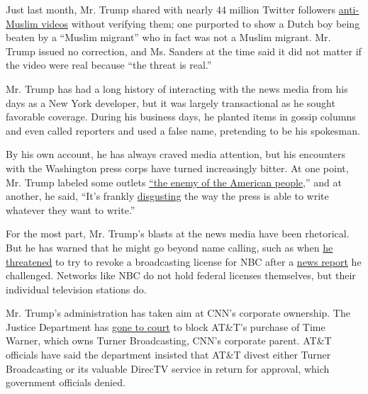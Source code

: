 Just last month, Mr. Trump shared with nearly 44 million Twitter
followers
\href{https://www.nytimes3xbfgragh.onion/2017/11/29/us/politics/trump-anti-muslim-videos-jayda-fransen.html}{anti-Muslim
videos} without verifying them; one purported to show a Dutch boy being
beaten by a ``Muslim migrant'' who in fact was not a Muslim migrant. Mr.
Trump issued no correction, and Ms. Sanders at the time said it did not
matter if the video were real because ``the threat is real.''

Mr. Trump has had a long history of interacting with the news media from
his days as a New York developer, but it was largely transactional as he
sought favorable coverage. During his business days, he planted items in
gossip columns and even called reporters and used a false name,
pretending to be his spokesman.

By his own account, he has always craved media attention, but his
encounters with the Washington press corps have turned increasingly
bitter. At one point, Mr. Trump labeled some outlets
\href{https://www.nytimes3xbfgragh.onion/2017/02/17/business/trump-calls-the-news-media-the-enemy-of-the-people.html}{``the
enemy of the American people},'' and at another, he said, ``It's frankly
\href{http://www.cnn.com/videos/politics/2017/10/11/donald-trump-nbc-media-write-whatever-it-wants-sot.cnn}{disgusting}
the way the press is able to write whatever they want to write.''

For the most part, Mr. Trump's blasts at the news media have been
rhetorical. But he has warned that he might go beyond name calling, such
as when
\href{https://www.nytimes3xbfgragh.onion/2017/10/11/us/politics/trump-nbc-fcc-broadcast-license.html}{he
threatened} to try to revoke a broadcasting license for NBC after a
\href{https://www.nbcnews.com/news/all/trump-wanted-dramatic-increase-nuclear-arsenal-meeting-military-leaders-n809701}{news
report} he challenged. Networks like NBC do not hold federal licenses
themselves, but their individual television stations do.

Mr. Trump's administration has taken aim at CNN's corporate ownership.
The Justice Department has
\href{https://www.nytimes3xbfgragh.onion/2017/11/20/business/dealbook/att-time-warner-merger.html}{gone
to court} to block AT\&T's purchase of Time Warner, which owns Turner
Broadcasting, CNN's corporate parent. AT\&T officials have said the
department insisted that AT\&T divest either Turner Broadcasting or its
valuable DirecTV service in return for approval, which government
officials denied.

